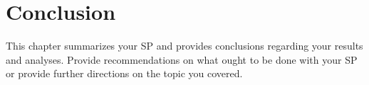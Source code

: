 \chapter{Conclusion}
This chapter  summarizes your SP and provides conclusions regarding your results and analyses.  Provide recommendations on what ought to be done with your SP or provide further directions on the topic you covered.